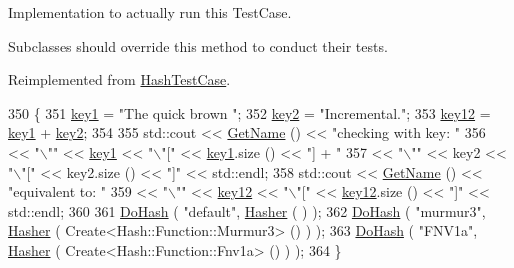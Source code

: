 Implementation to actually run this Test\+Case. 

Subclasses should override this method to conduct their tests. 

Reimplemented from \hyperlink{classHashTestCase_a4fe6e6b9431c983ed52fd472e9f0d3b4}{Hash\+Test\+Case}.


\begin{DoxyCode}
350 \{
351   \hyperlink{classIncrementalTestCase_a1bb155138fa8d3fe7c2f86702623d9a6}{key1} = \textcolor{stringliteral}{"The quick brown "};
352   \hyperlink{classIncrementalTestCase_a0703825a7eb63a4b697ddc3d6841dc53}{key2} = \textcolor{stringliteral}{"Incremental."};
353   \hyperlink{classIncrementalTestCase_afba5b3d91ad2937346bcb4279fb48e69}{key12}  = \hyperlink{classIncrementalTestCase_a1bb155138fa8d3fe7c2f86702623d9a6}{key1} + \hyperlink{classIncrementalTestCase_a0703825a7eb63a4b697ddc3d6841dc53}{key2};
354 
355   std::cout << \hyperlink{classns3_1_1TestCase_a28f7bb59669c24dae1c290fc17fc9b62}{GetName} () << \textcolor{stringliteral}{"checking with key: "}
356             << \textcolor{stringliteral}{"\(\backslash\)""} << \hyperlink{classIncrementalTestCase_a1bb155138fa8d3fe7c2f86702623d9a6}{key1}  << \textcolor{stringliteral}{"\(\backslash\)"["} << \hyperlink{classIncrementalTestCase_a1bb155138fa8d3fe7c2f86702623d9a6}{key1}.size ()  << \textcolor{stringliteral}{"] + "}
357             << \textcolor{stringliteral}{"\(\backslash\)""} << key2  << \textcolor{stringliteral}{"\(\backslash\)"["} << key2.size ()  << \textcolor{stringliteral}{"]"} << std::endl;
358   std::cout << \hyperlink{classns3_1_1TestCase_a28f7bb59669c24dae1c290fc17fc9b62}{GetName} () << \textcolor{stringliteral}{"equivalent to:     "}
359             << \textcolor{stringliteral}{"\(\backslash\)""} << \hyperlink{classIncrementalTestCase_afba5b3d91ad2937346bcb4279fb48e69}{key12} << \textcolor{stringliteral}{"\(\backslash\)"["} << \hyperlink{classIncrementalTestCase_afba5b3d91ad2937346bcb4279fb48e69}{key12}.size () << \textcolor{stringliteral}{"]"} << std::endl;
360 
361   \hyperlink{classIncrementalTestCase_aaf68c1b2c7547e01d4e8f3aaac196947}{DoHash} ( \textcolor{stringliteral}{"default"}, \hyperlink{classns3_1_1Hasher}{Hasher} ( ) );
362   \hyperlink{classIncrementalTestCase_aaf68c1b2c7547e01d4e8f3aaac196947}{DoHash} ( \textcolor{stringliteral}{"murmur3"}, \hyperlink{classns3_1_1Hasher}{Hasher} ( Create<Hash::Function::Murmur3> () ) );
363   \hyperlink{classIncrementalTestCase_aaf68c1b2c7547e01d4e8f3aaac196947}{DoHash} ( \textcolor{stringliteral}{"FNV1a"},   \hyperlink{classns3_1_1Hasher}{Hasher} ( Create<Hash::Function::Fnv1a> () ) );
364 \}
\end{DoxyCode}


